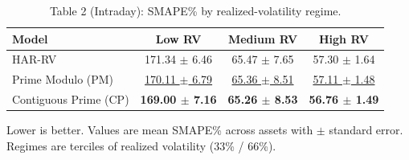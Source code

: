 \begin{table}[t]
\centering
\caption{Table 2 (Intraday): SMAPE\% by realized-volatility regime.}
\label{tab:regimes_intraday}
\begin{tabular}{lccc}
\toprule
Model & Low RV & Medium RV & High RV \\
\midrule
 HAR-RV & 171.34 $\pm$ 6.46 & 65.47 $\pm$ 7.65 & 57.30 $\pm$ 1.64 \\
 Prime Modulo (PM) & \underline{170.11 $\pm$ 6.79} & \underline{65.36 $\pm$ 8.51} & \underline{57.11 $\pm$ 1.48} \\
 Contiguous Prime (CP) & \textbf{169.00 $\pm$ 7.16} & \textbf{65.26 $\pm$ 8.53} & \textbf{56.76 $\pm$ 1.49} \\
\bottomrule
\end{tabular}
\vspace{2pt}\par\footnotesize Lower is better. Values are mean SMAPE\% across assets with $\pm$ standard error. Regimes are terciles of realized volatility (33\% / 66\%).
\end{table}